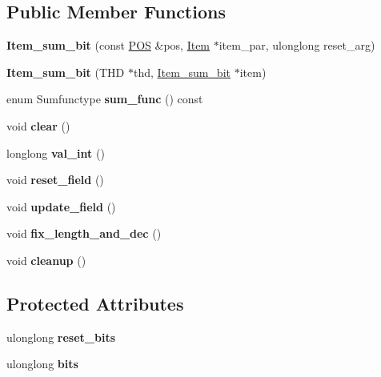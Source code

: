 \subsection*{Public Member Functions}
\begin{DoxyCompactItemize}
\item 
\mbox{\label{classItem__sum__bit_a8d01d8f9dd27601c299314ceca2c3a8d}} 
{\bfseries Item\+\_\+sum\+\_\+bit} (const \mbox{\hyperlink{structYYLTYPE}{P\+OS}} \&pos, \mbox{\hyperlink{classItem}{Item}} $\ast$item\+\_\+par, ulonglong reset\+\_\+arg)
\item 
\mbox{\label{classItem__sum__bit_ae830a1125fea199addfe880db1363ea2}} 
{\bfseries Item\+\_\+sum\+\_\+bit} (T\+HD $\ast$thd, \mbox{\hyperlink{classItem__sum__bit}{Item\+\_\+sum\+\_\+bit}} $\ast$item)
\item 
\mbox{\label{classItem__sum__bit_a9f711a7fae22aedca5ca095857523ee7}} 
enum Sumfunctype {\bfseries sum\+\_\+func} () const
\item 
\mbox{\label{classItem__sum__bit_a88462b24c55bdf8ccaaffd0c988255f3}} 
void {\bfseries clear} ()
\item 
\mbox{\label{classItem__sum__bit_a60de19ee93be60ca9d6a80614ef23fc4}} 
longlong {\bfseries val\+\_\+int} ()
\item 
\mbox{\label{classItem__sum__bit_ab93b18f9aa605cc6698bf4e7d94083f3}} 
void {\bfseries reset\+\_\+field} ()
\item 
\mbox{\label{classItem__sum__bit_ac450ffefa1ab4e7f6404fd758e45cbef}} 
void {\bfseries update\+\_\+field} ()
\item 
\mbox{\label{classItem__sum__bit_a68b9aeff0a850b0d8b7681cd8dc6f2a9}} 
void {\bfseries fix\+\_\+length\+\_\+and\+\_\+dec} ()
\item 
\mbox{\label{classItem__sum__bit_a1d0150abcd5ae61098839fe574fce674}} 
void {\bfseries cleanup} ()
\end{DoxyCompactItemize}
\subsection*{Protected Attributes}
\begin{DoxyCompactItemize}
\item 
\mbox{\label{classItem__sum__bit_a8fb69e155ba18f583db81b3bd0ea1943}} 
ulonglong {\bfseries reset\+\_\+bits}
\item 
\mbox{\label{classItem__sum__bit_aef58a7c72496dc0bf26b6d1c73d63f3e}} 
ulonglong {\bfseries bits}
\end{DoxyCompactItemize}
